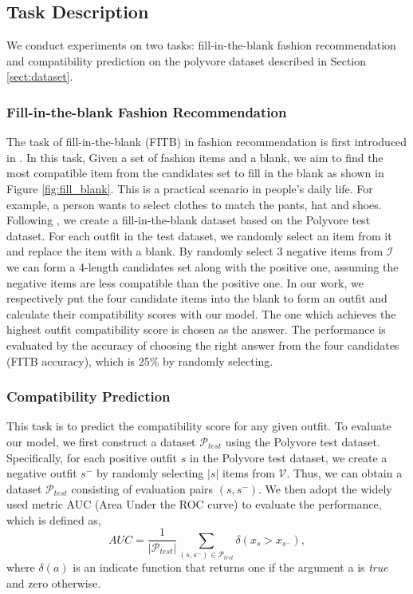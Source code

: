 \documentclass[sigconf]{acmart}
\begin{document}
\subsection{Task Description}
We conduct experiments on two tasks: fill-in-the-blank fashion recommendation and compatibility prediction on the polyvore dataset described in Section \ref{sect:dataset}.

\subsubsection{Fill-in-the-blank Fashion Recommendation}
The task of fill-in-the-blank (FITB) in fashion recommendation is first introduced in \cite{han2017learning}. In this task,
Given a set of fashion items and a blank, we aim to find the most compatible item from the candidates set to fill in the blank as shown in Figure \ref{fig:fill_blank}. This is a practical scenario in people's daily life. For example, a person wants to select clothes to match the pants, hat and shoes.
Following \cite{han2017learning}, we create a fill-in-the-blank dataset based on the Polyvore test dataset. For each outfit in the test dataset, we randomly select an item from it and replace the item with a blank. By randomly select 3 negative items from $\mathcal{I}$ we can form a 4-length candidates set along with the positive one, assuming the negative items are less compatible than the positive one.
In our work, we respectively put the four candidate items into the blank to form an outfit and calculate their compatibility scores with our model. The one which achieves the highest outfit compatibility score is chosen as the answer.
The performance is evaluated by the accuracy of choosing the right answer from the four candidates (FITB accuracy), which is 25\% by randomly selecting.


\subsubsection{Compatibility Prediction}
This task is to predict the compatibility score for any given outfit.
To evaluate our model, we first construct a dataset $\mathcal{P}_{test}$ using the Polyvore test dataset.
Specifically, for each positive outfit $s$ in the Polyvore test dataset, we create a negative outfit $s^{-}$ by randomly selecting $\left | s \right |$ items from $\mathcal{V}$. Thus, we can obtain a dataset $\mathcal{P}_{test}$ consisting of evaluation pairs $\left ( s, s^{-} \right )$. We then adopt the widely used metric AUC (Area Under the ROC curve) to evaluate the performance, which is defined as,
\begin{equation}\label{eq1}
AUC = \frac{1}{\left | \mathcal{P}_{test} \right |}\sum_{\left ( s, s^{-} \right ) \in \mathcal{P}_{test}} \delta \left ( x_{s} > x_{s^{-}} \right ),
\end{equation}
where $\delta \left( a \right )$ is an indicate function
that returns one if the argument a is \emph{true} and zero otherwise.
\end{document}
